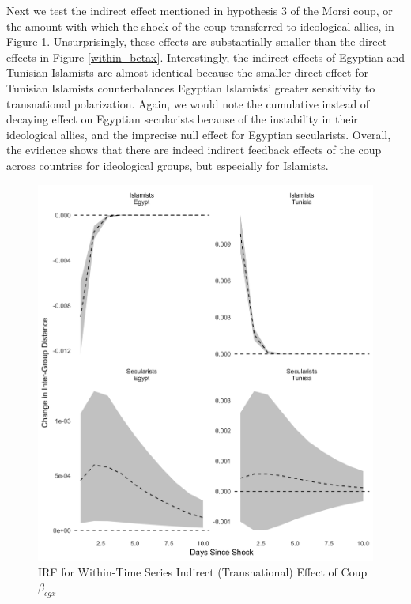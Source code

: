 \documentclass[12pt]{article}
\begin{document}
Next we test the indirect effect mentioned in hypothesis 3 of the Morsi coup, or the amount with which the shock of the coup transferred to ideological allies, in Figure \ref{indirect_betax}. Unsurprisingly, these effects are substantially smaller than the direct effects in Figure \ref{within_betax}. Interestingly, the indirect effects of Egyptian and Tunisian Islamists are almost identical because the smaller direct effect for Tunisian Islamists counterbalances Egyptian Islamists' greater sensitivity to transnational polarization. Again, we would note the cumulative instead of decaying effect on Egyptian secularists because of the instability in their ideological allies, and the imprecise null effect for Egyptian secularists. Overall, the evidence shows that there are indeed indirect feedback effects of the coup across countries for ideological groups, but especially for Islamists.
 \begin{figure}[!h]
	\centering
	\caption{IRF for Within-Time Series Indirect (Transnational) Effect of Coup $\beta_{cgx}$}\label{indirect_betax}
	\centering
	\includegraphics[width=.9\linewidth]{irf_betax_other}
\end{figure}
\end{document}
